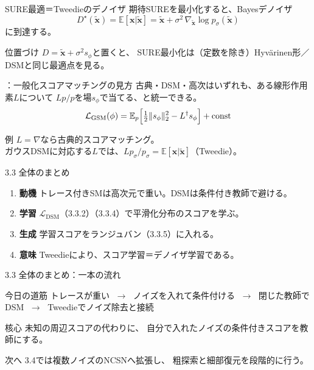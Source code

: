 \assuppl
\begin{frame}{SURE最適＝Tweedieのデノイザ}
    期待SUREを最小化すると、Bayesデノイザ
    \[
        D^{\star}(\tilde{\bm{x}})
        =
        \mathbb{E}[\bm{x}|\tilde{\bm{x}}]
        =
        \tilde{\bm{x}}
        +
        \sigma^{2}\,
        \nabla_{\tilde{\bm{x}}}\log p_{\sigma}(\tilde{\bm{x}})
        \tag{3.3.8}
    \]
    に到達する。
    \begin{exampleblock}{位置づけ}
        $D=\tilde{\bm{x}}+\sigma^{2}s_\phi$と置くと、
        SURE最小化は（定数を除き）Hyv\"arinen形／DSMと同じ最適点を見る。
    \end{exampleblock}
\end{frame}
\assuppl
\begin{frame}{\supplmark：一般化スコアマッチングの見方}
    古典・DSM・高次はいずれも、ある線形作用素$L$について
    $Lp/p$を場$s_\phi$で当てる、と統一できる。
    \[
        \mathcal{L}_{\mathrm{GSM}}(\phi)
        =
        \mathbb{E}_{p}
        \Bigl[
        \tfrac12\|s_\phi\|_{2}^{2}
        -
        L^{\dagger}s_\phi
        \Bigr]
        +\mathrm{const}
    \]
    \begin{exampleblock}{例}
        $L=\nabla$なら古典的スコアマッチング。\\
        ガウスDSMに対応する$L$では、$Lp_{\sigma}/p_{\sigma}=\mathbb{E}[\bm{x}|\tilde{\bm{x}}]$（Tweedie）。
    \end{exampleblock}
\end{frame}
\asmain
\begin{frame}{3.3 全体のまとめ}
    \begin{enumerate}
        \item \textbf{動機}
        トレース付きSMは高次元で重い。DSMは条件付き教師で避ける。
        \item \textbf{学習}
        $\mathcal{L}_{\mathrm{DSM}}$（3.3.2）（3.3.4）で平滑化分布のスコアを学ぶ。
        \item \textbf{生成}
        学習スコアをランジュバン（3.3.5）に入れる。
        \item \textbf{意味}
        Tweedieにより、スコア学習＝デノイザ学習である。
    \end{enumerate}
\end{frame}
\asmain
\begin{frame}{3.3 全体のまとめ：一本の流れ}
    \begin{block}{今日の道筋}
        トレースが重い
        $\;\to\;$
        ノイズを入れて条件付ける
        $\;\to\;$
        閉じた教師でDSM
        $\;\to\;$
        Tweedieでノイズ除去と接続
    \end{block}
    \begin{block}{核心}
        未知の周辺スコアの代わりに、
        自分で入れたノイズの条件付きスコアを教師にする。
    \end{block}
    \begin{block}{次へ}
        3.4では複数ノイズのNCSNへ拡張し、
        粗探索と細部復元を段階的に行う。
    \end{block}
\end{frame}
